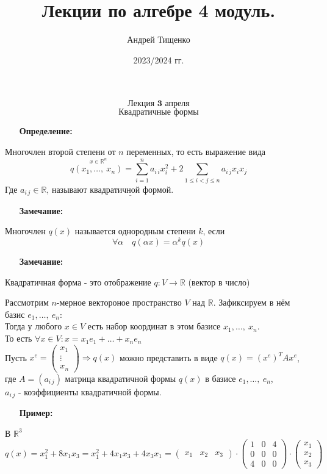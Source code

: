 \documentclass[12pt, letterpaper, twoside]{article}
\title{Лекции по алгебре 4 модуль.}
\author{Андрей Тищенко}
\date{2023/2024 гг.}
\newcommand{\Underl}[1]{$\underline{\text{#1}}$}
\begin{document}
    \maketitle
    \[\textbf{Лекция 3 апреля}\]
    \[\text{Квадратичные формы}\]
    \begin{enumerate}
        \item[\textbf{Определение:}]
    \end{enumerate}
    Многочлен второй степени от $n$ переменных, то есть выражение вида
        \[q\overset{x\in \mathbb{R}^n}{(x_1,\dots,\ x_n)} = \sum_{i = 1}^{n} a_{i\, i}x_i^2 + 2\sum_{1\leq i < j \leq n} a_{i\, j}x_{i}x_{j}\]
        Где $a_{i\, j}\in \mathbb{R}$, называют \Underl{квадратичной формой}.
    \begin{enumerate}
        \item[\textbf{Замечание:}]
    \end{enumerate}
        Многочлен $q(x)$ называется однородным степени $k$, если
        \[\forall \alpha\quad q(\alpha x) = \alpha^k q(x)\]
    \begin{enumerate}
        \item[\textbf{Замечание:}] 
    \end{enumerate}
    Квадратичная форма - это отображение $q: V\longrightarrow \mathbb{R}$ (вектор в число)\\
     \par
    Рассмотрим $n$-мерное вектороное пространство $V$ над $\mathbb{R}$. Зафиксируем в нём базис $e_1,\dots,\ e_n$:\\
    Тогда у любого $x\in V$ есть набор координат в этом базисе $x_1,\dots,\ x_n$.\\
    То есть $\forall x\in V: x=x_1e_1+\dots+x_{n} e_{n}$\\
    Пусть $x^e = \begin{pmatrix}
        x_1\\
        \vdots\\
        x_n
    \end{pmatrix}\Rightarrow q(x)$ можно представить в виде $q(x) = (x^e)^{T}A x^{e}$, где $A = (a_{i\, j})$ матрица квадратичной формы $q(x)$ в базисе $e_1,\dots,\ e_n$,\\
    $a_{i\, j}$ - коэффициенты квадратичной формы.
    \begin{enumerate}
        \item[\textbf{Пример:}]
    \end{enumerate}
    В $\mathbb{R}^3$
        \[q(x) = x_1^2 + 8 x_1 x_3 = x_1^2 + 4 x_1 x_3 + 4x_3 x_1 = \begin{pmatrix}
            x_1 & x_2 & x_3
        \end{pmatrix}\cdot \begin{pmatrix}
            1 & 0 & 4\\
            0 & 0 & 0\\
            4 & 0 & 0
        \end{pmatrix}\cdot \begin{pmatrix}
            x_1\\
            x_2\\
            x_3
        \end{pmatrix}\]
\end{document}
